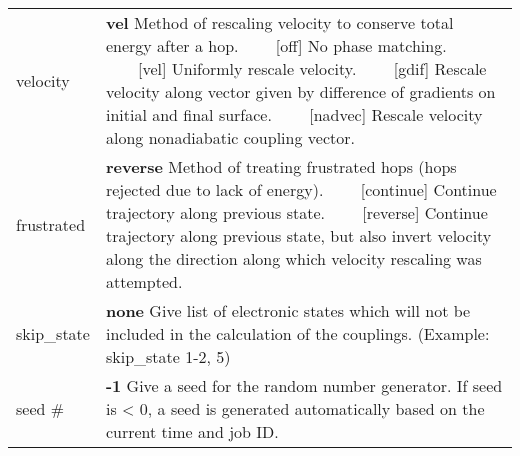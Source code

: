 \documentclass{report}
\newcommand{\tabitem}{~~\llap{--}~~}
\begin{document}
\begin{tabularx}{\textwidth}{ m{2.5cm} X }
velocity		&
	\textbf{vel} \newline
	Method of rescaling velocity to conserve total energy after a hop. \newline
	\tabitem [off] No phase matching. \newline
	\tabitem [vel] Uniformly rescale velocity. \newline
	\tabitem [gdif] Rescale velocity along vector given by difference of gradients on initial and final surface. \newline
	\tabitem [nadvec] Rescale velocity along nonadiabatic coupling vector. \\

frustrated		&
	\textbf{reverse} \newline
	Method of treating frustrated hops (hops rejected due to lack of energy). \newline
	\tabitem [continue] Continue trajectory along previous state. \newline
	\tabitem [reverse] Continue trajectory along previous state, but also invert velocity along the direction along which velocity rescaling was attempted. \\

skip\_state		&
	\textbf{none} \newline
	Give list of electronic states which will not be included in the calculation of the couplings. (Example: skip\_state 1-2, 5) \\
	
seed \# 		&
	\textbf{-1} \newline
	Give a seed for the random number generator. If seed is < 0, a seed is generated automatically based on the current time and job ID. \\
\end{tabularx}
\end{document}
